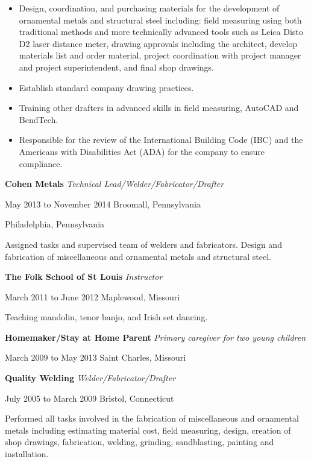 \documentclass[9pt]{extarticle}
\begin{document}
\begin{itemize}
    \item Design, coordination, and purchasing materials for the development of ornamental metals and structural steel including: field
measuring using both traditional methods and more technically advanced tools such as Leica Disto D2 laser distance meter,
drawing approvals including the architect, develop materials list and order material, project coordination with project manager
and project superintendent, and final shop drawings.
\item Establish standard company drawing practices.
\item Training other drafters in advanced skills in field measuring, AutoCAD and BendTech.
\item Responsible for the review of the International Building Code (IBC) and the Americans with Disabilities Act (ADA) for the
company to ensure compliance.
\end{itemize}

\hfill

\textbf{Cohen Metals} \hfill \textit{Technical Lead/Welder/Fabricator/Drafter}

May 2013 to November 2014 \hfill Broomall, Pennsylvania

\hfill Philadelphia, Pennsylvania

\hfill

 Assigned tasks and supervised team of welders and fabricators.
 Design and fabrication of miscellaneous and ornamental metals and structural steel.

\hfill

\textbf{The Folk School of St Louis} \hfill \textit{Instructor}

March 2011 to June 2012 \hfill Maplewood, Missouri

\hfill

Teaching mandolin, tenor banjo, and Irish set dancing.

\hfill

\textbf{Homemaker/Stay at Home Parent} \hfill \textit{Primary caregiver for two young children}

March 2009 to May 2013 \hfill Saint Charles, Missouri

\hfill

\textbf{Quality Welding} \hfill \textit{Welder/Fabricator/Drafter}

July 2005 to March 2009 \hfill Bristol, Connecticut

\hfill

Performed all tasks involved in the fabrication of miscellaneous and ornamental metals including estimating material cost, field
measuring, design, creation of shop drawings, fabrication, welding, grinding, sandblasting, painting and installation.
\end{document}
